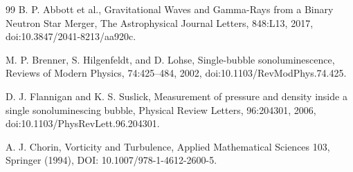\documentclass[10pt,reprint,aps,onecolumn,nofootinbib]{revtex4-2}
\begin{document}
\begin{thebibliography}{99}
     B. P. Abbott et al., Gravitational Waves and Gamma-Rays from a Binary Neutron Star Merger, The Astrophysical Journal Letters, 848:L13, 2017, doi:10.3847/2041-8213/aa920c.

     M. P. Brenner, S. Hilgenfeldt, and D. Lohse, Single-bubble sonoluminescence, Reviews of Modern Physics, 74:425--484, 2002, doi:10.1103/RevModPhys.74.425.

     D. J. Flannigan and K. S. Suslick, Measurement of pressure and density inside a single sonoluminescing bubble, Physical Review Letters, 96:204301, 2006, doi:10.1103/PhysRevLett.96.204301.


     A. J. Chorin, Vorticity and Turbulence, Applied Mathematical Sciences 103, Springer (1994), DOI: 10.1007/978-1-4612-2600-5.


\end{thebibliography}
\end{document}
